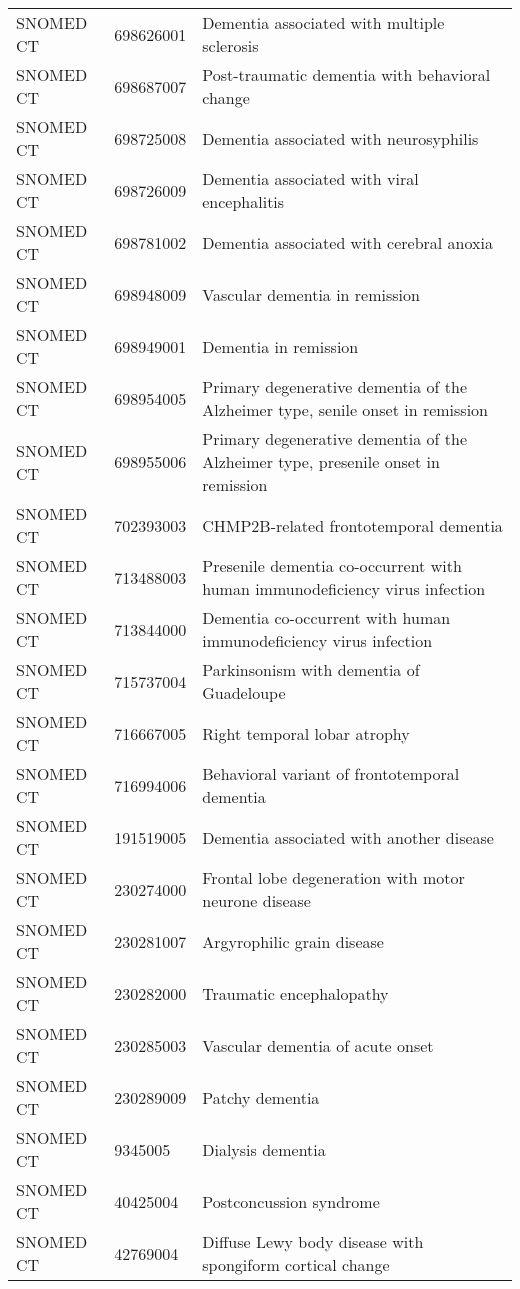 \begin{longtable}{p{}p{}p{}}
  SNOMED CT & 698626001 & Dementia associated with multiple sclerosis \\ 
  SNOMED CT & 698687007 & Post-traumatic dementia with behavioral change \\ 
  SNOMED CT & 698725008 & Dementia associated with neurosyphilis \\ 
  SNOMED CT & 698726009 & Dementia associated with viral encephalitis \\ 
  SNOMED CT & 698781002 & Dementia associated with cerebral anoxia \\ 
  SNOMED CT & 698948009 & Vascular dementia in remission \\ 
  SNOMED CT & 698949001 & Dementia in remission \\ 
  SNOMED CT & 698954005 & Primary degenerative dementia of the Alzheimer type, senile onset in remission \\ 
  SNOMED CT & 698955006 & Primary degenerative dementia of the Alzheimer type, presenile onset in remission \\ 
  SNOMED CT & 702393003 & CHMP2B-related frontotemporal dementia \\ 
  SNOMED CT & 713488003 & Presenile dementia co-occurrent with human immunodeficiency virus infection \\ 
  SNOMED CT & 713844000 & Dementia co-occurrent with human immunodeficiency virus infection \\ 
  SNOMED CT & 715737004 & Parkinsonism with dementia of Guadeloupe \\ 
  SNOMED CT & 716667005 & Right temporal lobar atrophy \\ 
  SNOMED CT & 716994006 & Behavioral variant of frontotemporal dementia \\ 
  SNOMED CT & 191519005 & Dementia associated with another disease \\ 
  SNOMED CT & 230274000 & Frontal lobe degeneration with motor neurone disease \\ 
  SNOMED CT & 230281007 & Argyrophilic grain disease \\ 
  SNOMED CT & 230282000 & Traumatic encephalopathy \\ 
  SNOMED CT & 230285003 & Vascular dementia of acute onset \\ 
  SNOMED CT & 230289009 & Patchy dementia \\ 
  SNOMED CT & 9345005 & Dialysis dementia \\ 
  SNOMED CT & 40425004 & Postconcussion syndrome \\ 
  SNOMED CT & 42769004 & Diffuse Lewy body disease with spongiform cortical change \\ 

\end{longtable}
